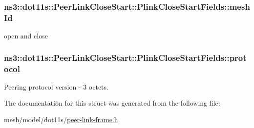 \subsubsection[{\texorpdfstring{mesh\+Id}{meshId}}]{ ns3\+::dot11s\+::\+Peer\+Link\+Close\+Start\+::\+Plink\+Close\+Start\+Fields\+::mesh\+Id}\hypertarget{structns3_1_1dot11s_1_1PeerLinkCloseStart_1_1PlinkCloseStartFields_a3ab466662b52bcfa68ee148321b9625b}{}\label{structns3_1_1dot11s_1_1PeerLinkCloseStart_1_1PlinkCloseStartFields_a3ab466662b52bcfa68ee148321b9625b}


open and close 

\subsubsection[{\texorpdfstring{protocol}{protocol}}]{ ns3\+::dot11s\+::\+Peer\+Link\+Close\+Start\+::\+Plink\+Close\+Start\+Fields\+::protocol}\hypertarget{structns3_1_1dot11s_1_1PeerLinkCloseStart_1_1PlinkCloseStartFields_ad6dc172ca5777398b8c85c18fa8c9e1b}{}\label{structns3_1_1dot11s_1_1PeerLinkCloseStart_1_1PlinkCloseStartFields_ad6dc172ca5777398b8c85c18fa8c9e1b}


Peering protocol version -\/ 3 octets. 



The documentation for this struct was generated from the following file\+:\begin{DoxyCompactItemize}
\item 
mesh/model/dot11s/\hyperlink{peer-link-frame_8h}{peer-\/link-\/frame.\+h}\end{DoxyCompactItemize}
